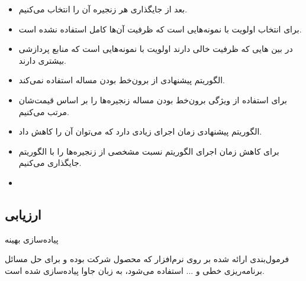 \documentclass{beamer}
\makeatletter
\newcommand{\RTList}{\raggedleft\rightskip\@totalleftmargin}
\makeatother
\begin{document}
\begin{persian}
\begin{frame}{}
\begin{itemize}
        \item بعد از جایگذاری هر زنجیره  آن را انتخاب می‌کنیم.
        \item برای انتخاب  اولویت با نمونه‌هایی است که ظرفیت آن‌ها کامل استفاده نشده است.
        \item در بین هایی که ظرفیت خالی دارند اولویت با نمونه‌هایی است که منابع پردازشی بیشتری دارند.
    \end{itemize}
\end{frame}
\begin{frame}{}
    \begin{itemize}\RTList{}
        \justifying
        \item الگوریتم پیشنهادی  از برون‌خط بودن مساله استفاده نمی‌کند.
        \item برای استفاده از ویژگی برون‌خط بودن مساله زنجیره‌ها را بر اساس قیمت‌شان مرتب می‌کنیم.
        \item الگوریتم پیشنهادی  زمان اجرای زیادی دارد که می‌توان آن را کاهش داد.
        \item برای کاهش زمان اجرای الگوریتم نسبت مشخصی از زنجیره‌ها را با الگوریتم  جایگذاری می‌کنیم.
        \item {}
    \end{itemize}
\end{frame}
\begin{frame}{}
    \section{ارزیابی}
\end{frame}
\begin{frame}{پیاده‌سازی بهینه}
    \par
    فرمول‌بندی ارائه شده بر روی نرم‌افزار
    که محصول شرکت  بوده و برای حل مسائل برنامه‌ریزی خطی و ...
    استفاده می‌شود،
    به زبان جاوا پیاده‌سازی شده است.


\end{frame}
\end{persian}
\end{document}
